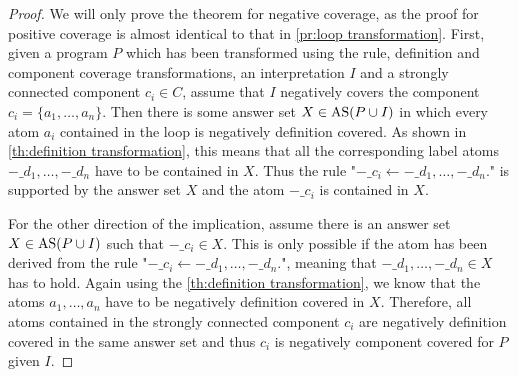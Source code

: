 \begin{proof}
\label{pr:component transformation}
    We will only prove the theorem for negative coverage, as the proof for positive coverage is almost identical to that in \cref{pr:loop transformation}. First, given a program $P$ which has been transformed using the rule, definition and component coverage transformations, an interpretation $I$ and a strongly connected component $c_i \in C$, assume that $I$ negatively covers the component \(c_i = \{a_1, \ldots, a_n\}\). Then there is some answer set \(X \in \operatorname{AS}(P \cup I)\) in which every atom $a_i$ contained in the loop is negatively definition covered. As shown in \cref{th:definition transformation}, this means that all the corresponding label atoms \(-\_d_1, \ldots, -\_d_n\) have to be contained in $X$. Thus the rule "\(-\_c_i \leftarrow -\_d_1, \ldots, -\_d_n.\)" is supported by the answer set $X$ and the atom $-\_c_i$ is contained in $X$. 

    For the other direction of the implication, assume there is an answer set \(X \in \operatorname{AS}(P \cup I)\) such that \(-\_c_i \in X\). This is only possible if the atom has been derived from the rule "\(-\_c_i \leftarrow -\_d_1, \ldots, -\_d_n.\)", meaning that \(-\_d_1, \ldots, -\_d_n \in X\) has to hold. Again using the \cref{th:definition transformation}, we know that the atoms \(a_1, \ldots, a_n\) have to be negatively definition covered in $X$. Therefore, all atoms contained in the strongly connected component $c_i$ are negatively definition covered in the same answer set and thus $c_i$ is negatively component covered for $P$ given $I$.
\end{proof}

